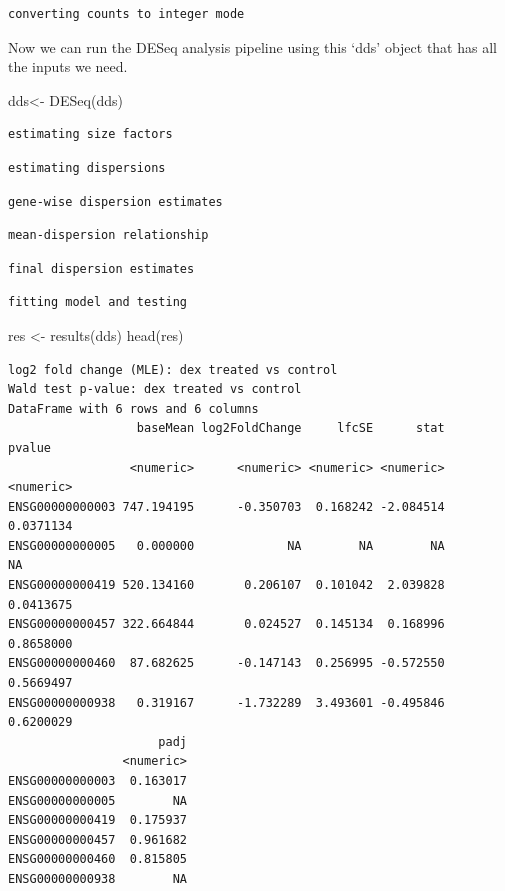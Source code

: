\documentclass[
  letterpaper,
  DIV=11,
  numbers=noendperiod]{scrartcl}
\newenvironment{Shaded}{\begin{snugshade}}{\end{snugshade}}
\newcommand{\FunctionTok}[1]{\textcolor[rgb]{0.28,0.35,0.67}{#1}}
\newcommand{\NormalTok}[1]{\textcolor[rgb]{0.00,0.23,0.31}{#1}}
\newcommand{\OtherTok}[1]{\textcolor[rgb]{0.00,0.23,0.31}{#1}}
\begin{document}
\begin{verbatim}
converting counts to integer mode
\end{verbatim}

Now we can run the DESeq analysis pipeline using this `dds' object that
has all the inputs we need.

\begin{Shaded}
\begin{Highlighting}[]
\NormalTok{dds}\OtherTok{\textless{}{-}} \FunctionTok{DESeq}\NormalTok{(dds)}
\end{Highlighting}
\end{Shaded}

\begin{verbatim}
estimating size factors
\end{verbatim}

\begin{verbatim}
estimating dispersions
\end{verbatim}

\begin{verbatim}
gene-wise dispersion estimates
\end{verbatim}

\begin{verbatim}
mean-dispersion relationship
\end{verbatim}

\begin{verbatim}
final dispersion estimates
\end{verbatim}

\begin{verbatim}
fitting model and testing
\end{verbatim}

\begin{Shaded}
\begin{Highlighting}[]
\NormalTok{res }\OtherTok{\textless{}{-}} \FunctionTok{results}\NormalTok{(dds)}
\FunctionTok{head}\NormalTok{(res)}
\end{Highlighting}
\end{Shaded}

\begin{verbatim}
log2 fold change (MLE): dex treated vs control 
Wald test p-value: dex treated vs control 
DataFrame with 6 rows and 6 columns
                  baseMean log2FoldChange     lfcSE      stat    pvalue
                 <numeric>      <numeric> <numeric> <numeric> <numeric>
ENSG00000000003 747.194195      -0.350703  0.168242 -2.084514 0.0371134
ENSG00000000005   0.000000             NA        NA        NA        NA
ENSG00000000419 520.134160       0.206107  0.101042  2.039828 0.0413675
ENSG00000000457 322.664844       0.024527  0.145134  0.168996 0.8658000
ENSG00000000460  87.682625      -0.147143  0.256995 -0.572550 0.5669497
ENSG00000000938   0.319167      -1.732289  3.493601 -0.495846 0.6200029
                     padj
                <numeric>
ENSG00000000003  0.163017
ENSG00000000005        NA
ENSG00000000419  0.175937
ENSG00000000457  0.961682
ENSG00000000460  0.815805
ENSG00000000938        NA
\end{verbatim}
\end{document}
